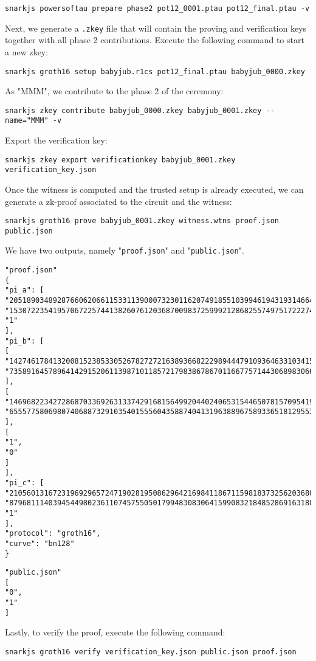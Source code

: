 \documentclass[a4paper,oneside,12pt]{book}
\begin{document}
\verb|snarkjs powersoftau prepare phase2 pot12_0001.ptau pot12_final.ptau -v|

\noindent Next, we generate a \verb|.zkey| file that will contain the proving and verification keys together with all phase 2 contributions. Execute the following command to start a new zkey:

\verb|snarkjs groth16 setup babyjub.r1cs pot12_final.ptau babyjub_0000.zkey|

\noindent As "MMM", we contribute to the phase 2 of the ceremony:

\verb|snarkjs zkey contribute babyjub_0000.zkey babyjub_0001.zkey --name="MMM" -v|

\noindent Export the verification key:

\verb|snarkjs zkey export verificationkey babyjub_0001.zkey verification_key.json|

\noindent Once the witness is computed and the trusted setup is already executed, we can generate a zk-proof associated to the circuit and the witness:

\verb|snarkjs groth16 prove babyjub_0001.zkey witness.wtns proof.json public.json|

\noindent We have two outputs, namely "\verb|proof.json|" and "\verb|public.json|".

\begin{verbatim}
"proof.json"
{
"pi_a": [
"20518903489287660620661153311390007323011620749185510399461943193146649102472",
"15307223541957067225744138260761203687009837259992128682557497517222743661548",
"1"
],
"pi_b": [
[
"14274617841320081523853305267827272163893668222989444791093646331034150484531",
"7358916457896414291520611398710118572179838678670116677571443068983066759462"
],
[
"14696822342728687033692631337429168156499204402406531544650781570954192796088",
"6555775806980740688732910354015556043588740413196388967589336518129553848787"
],
[
"1",
"0"
]
],
"pi_c": [
"21056013167231969296572471902819508629642169841186711598183732562036802928843",
"879681114039454498023611074575505017994830830641599083218485286916318893313",
"1"
],
"protocol": "groth16",
"curve": "bn128"
}
\end{verbatim}

\begin{verbatim}
"public.json"
[
"0",
"1"
]
\end{verbatim}
\noindent Lastly, to verify the proof, execute the following command:

\verb|snarkjs groth16 verify verification_key.json public.json proof.json|
\end{document}

